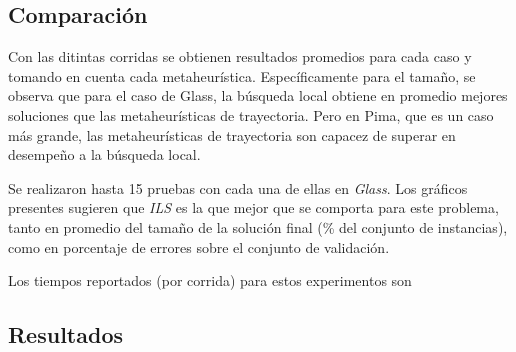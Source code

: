 \documentclass[11pt]{article}
\begin{document}
\subsection{Comparación}

Con las ditintas corridas se obtienen resultados promedios para cada caso y tomando en cuenta cada metaheurística. Específicamente para el tamaño, se observa que para el caso de Glass, la búsqueda local obtiene en promedio mejores soluciones que las metaheurísticas de trayectoria. Pero en Pima, que es un caso más grande, las metaheurísticas de trayectoria son capacez de superar en desempeño a la búsqueda local.

\begin{table}[h]
\caption{Resultados para error de validación promedio con parámetros entonados}
\label{tabla:2}
\end{table}

Se realizaron 
hasta 15 pruebas con cada una de ellas en \emph{Glass}. Los gráficos 
presentes sugieren que \emph{ILS} es la que mejor que se comporta para este problema, 
tanto en promedio del tamaño de la solución final (\% del conjunto de instancias), 
como en porcentaje de errores sobre el conjunto de validación.

Los tiempos reportados (por corrida) para estos experimentos son

\begin{table}[h]
\caption{Resultados para tamaño de solución}
\label{tabla:2}
\end{table}

\subsection{Resultados}
\end{document}
